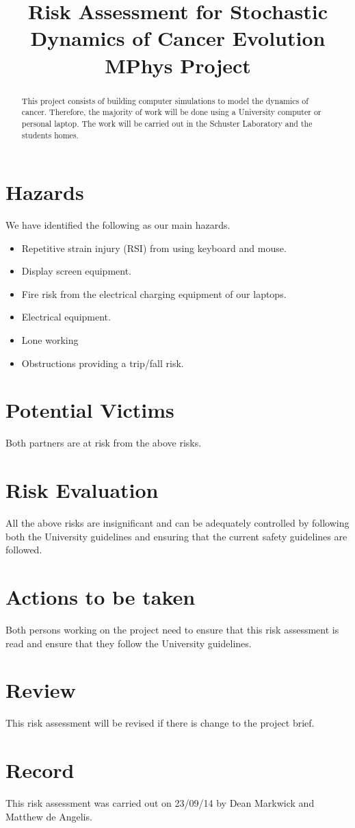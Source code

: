 \documentclass[a4paper]{article}
\title{Risk Assessment for Stochastic Dynamics of Cancer Evolution MPhys Project}
\date{}
\begin{document}
\maketitle

\begin{abstract}
This project consists of building computer simulations to model the dynamics of cancer. Therefore, the majority of work will be done using a University computer or personal laptop. The work will be carried out in the Schuster Laboratory and the students homes. 
\end{abstract}

\section{Hazards}

We have identified the following as our main hazards. 

\begin{itemize}
\item Repetitive strain injury (RSI) from using keyboard and mouse. 
\item Display screen equipment.
\item Fire risk from the electrical charging equipment of our laptops. 
\item Electrical equipment.
\item Lone working 
\item Obstructions providing a trip/fall risk.
\end{itemize}

\section{Potential Victims}

Both partners are at risk from the above risks. 

\section{Risk Evaluation}

All the above risks are insignificant and can be adequately controlled by following both the University guidelines and ensuring that the current safety guidelines are followed. 

\section{Actions to be taken}

Both persons working on the project need to ensure that this risk assessment is read and ensure that they follow the University guidelines. 

\section{Review}

This risk assessment will be revised if there is change to the project brief. 

\section{Record}

This risk assessment was carried out on 23/09/14 by Dean Markwick and Matthew de Angelis.  
\end{document}
